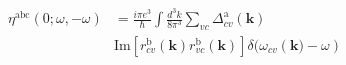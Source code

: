 \documentclass{article}
\begin{document}
\begin{align*}
\eta^{\mathrm{abc}} (0;\omega,-\omega) &=
\frac{i \pi e^{3}}{\hbar} \int \frac{d^{3} k}{8 \pi^{3}}
\sum_{vc} \Delta^{\mathrm{a}}_{cv}(\mathbf{k}) 
\\&
\mathrm{Im} \left[r^{\mathrm{b}}_{cv}(\mathbf{k}) r^{\mathrm{b}}_{vc}(\mathbf{k}) \right]
\delta(\omega_{cv} \left(\mathbf{k}) - \omega \right)
\end{align*}
\end{document}
